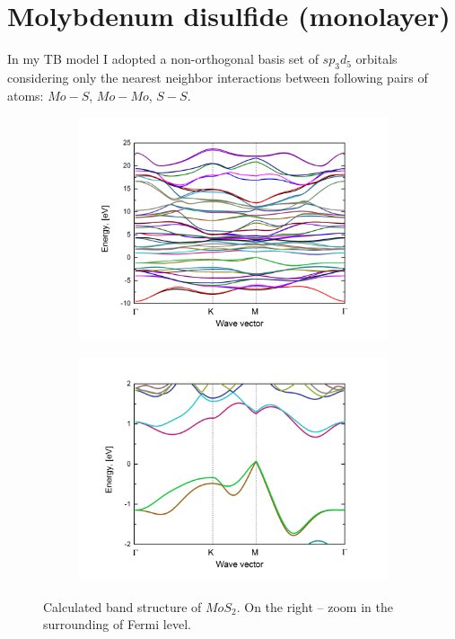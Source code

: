 \chapter{Molybdenum disulfide (monolayer)}
In my TB model I adopted a non-orthogonal basis set of $sp_3 d_5$ orbitals considering only the nearest neighbor interactions between following pairs of atoms: $Mo - S$, $Mo-Mo$, $S-S$.
\begin{figure}[ht]
\begin{center}
\begin{subfigure}{.5\textwidth}
  \centering
  \includegraphics[width=\linewidth]{img/mos2_all}
  \label{fig:mos2_all}
\end{subfigure}%
\begin{subfigure}{.5\textwidth}
  \centering
  \includegraphics[width=\linewidth]{img/mos2_zoom}
  \label{fig:mos2_zoom}
\end{subfigure}
  \caption{Calculated band structure of $MoS_2$. On the right -- zoom in the surrounding of Fermi level.}
\end{center}
\end{figure}  


